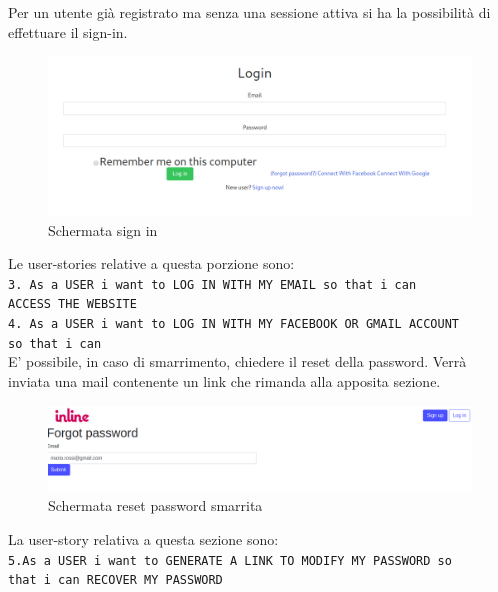 	Per un utente già registrato ma senza una sessione attiva si ha la possibilità di effettuare il sign-in.
	\begin{figure}[H]
		\includegraphics[width=\columnwidth]{./media/image9.png}
		\caption{Schermata sign in}
	\end{figure}
	Le user-stories relative a questa porzione sono:\\
	\texttt{3. As a USER i want to LOG IN WITH MY EMAIL so that i can \\ ACCESS THE WEBSITE}\\
	\texttt{4. As a USER i want to LOG IN WITH MY FACEBOOK OR GMAIL ACCOUNT \\ so that i can}\\
	
	E' possibile, in caso di smarrimento, chiedere il reset della password. Verrà inviata una mail contenente un link che rimanda alla apposita sezione.
	\begin{figure}[H]
		\includegraphics[width=\columnwidth]{./media/image7.png}
		\caption{Schermata reset password smarrita}
	\end{figure}
	
		La user-story relativa a questa sezione sono:\\
	\texttt{5.As a USER i want to GENERATE A LINK TO MODIFY MY PASSWORD so \\ that i can RECOVER MY PASSWORD}\\\\

